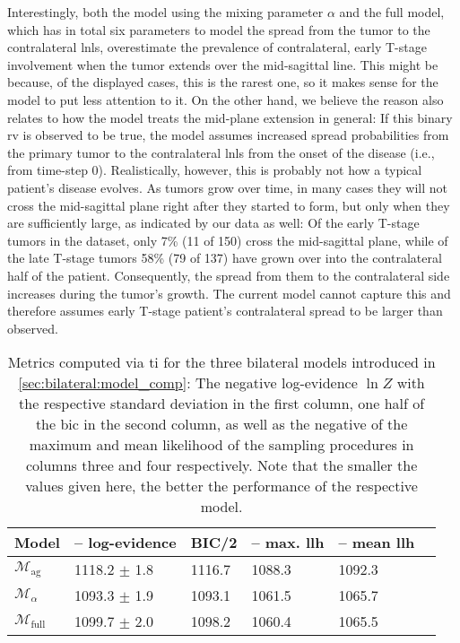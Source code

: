 \documentclass[\relativeRoot/main.tex]{subfiles}
\begin{document}
Interestingly, both the model using the mixing parameter $\alpha$ and the full model, which has in total six parameters to model the spread from the tumor to the contralateral \glspl{lnl}, overestimate the prevalence of contralateral, early T-stage involvement when the tumor extends over the mid-sagittal line. This might be because, of the displayed cases, this is the rarest one, so it makes sense for the model to put less attention to it. On the other hand, we believe the reason also relates to how the model treats the mid-plane extension in general: If this binary \gls{rv} is observed to be true, the model assumes increased spread probabilities from the primary tumor to the contralateral \glspl{lnl} from the onset of the disease (i.e., from time-step 0). Realistically, however, this is probably not how a typical patient's disease evolves. As tumors grow over time, in many cases they will not cross the mid-sagittal plane right after they started to form, but only when they are sufficiently large, as indicated by our data as well: Of the early T-stage tumors in the dataset, only 7\% (11 of 150) cross the mid-sagittal plane, while of the late T-stage tumors 58\% (79 of 137) have grown over into the contralateral half of the patient. Consequently, the spread from them to the contralateral side increases during the tumor's growth. The current model cannot capture this and therefore assumes early T-stage patient's contralateral spread to be larger than observed.

\begin{table}
    \centering
    \begin{tabular}{|l|l|l|l|l|l|}
        \hline
        \textbf{Model} & \textbf{-- log-evidence} & \textbf{BIC/2} & \textbf{-- max. llh} & \textbf{-- mean llh} \\
        \hline
        $\mathcal{M}_\text{ag}$ & 1118.2 $\pm$ 1.8 & 1116.7 & 1088.3 & 1092.3 \\
        $\mathcal{M}_\alpha$ & 1093.3 $\pm$ 1.9 & 1093.1 & 1061.5 & 1065.7 \\
        $\mathcal{M}_\text{full}$ & 1099.7 $\pm$ 2.0 & 1098.2 & 1060.4 & 1065.5 \\
        \hline
    \end{tabular}
    \caption[
        Metrics for assessing three bilateral models
    ]{
        Metrics computed via \gls{ti} for the three bilateral models introduced in \cref{sec:bilateral:model_comp}: The negative log-evidence $\ln{Z}$ with the respective standard deviation in the first column, one half of the \gls{bic} in the second column, as well as the negative of the maximum and mean likelihood of the sampling procedures in columns three and four respectively. Note that the smaller the values given here, the better the performance of the respective model.
    }
    \label{table:bilateral:model_comp:evidences}
\end{table}
\end{document}

